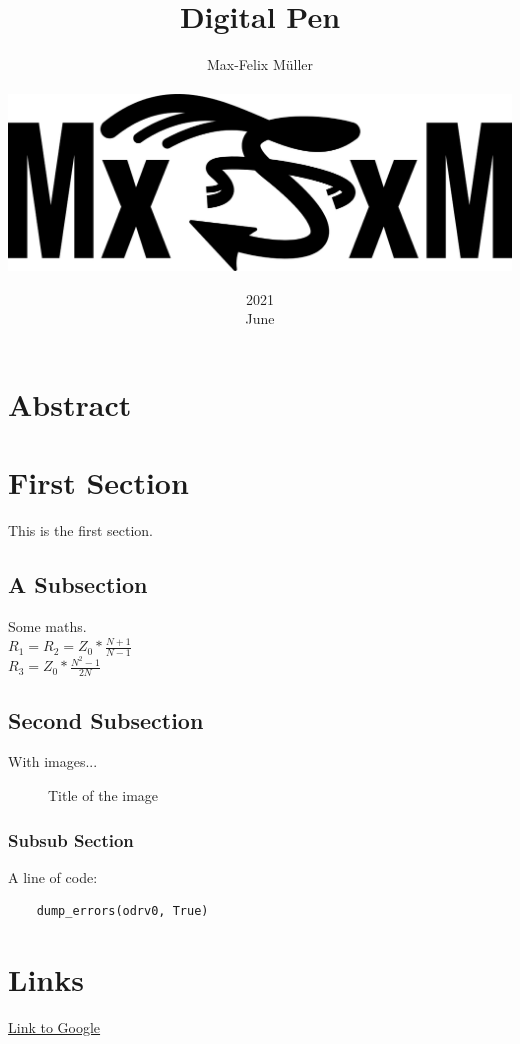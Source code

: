 \documentclass[a4paper,titlepage]{article}
\title{Digital Pen}
\date{2021\\ June}
\author{Max-Felix Müller\\ \\ \includegraphics[width=\textwidth]{mxfxm.png}}
\begin{document}
\maketitle
\tableofcontents
\newpage
\listoffigures %
\listoftables %
\newpage

\section*{Abstract}

\section{First Section}
This is the first section.

\subsection{A Subsection}
Some maths. \\

$R_{1} = R_{2} = Z_{0} * \frac{N + 1}{N - 1} $\\

$R_{3} = Z_{0} * \frac{N^2 - 1}{2N} $\\

\subsection{Second Subsection}

With images...

\begin{figure}[H]
    \caption{Title of the image}
\end{figure}

\subsubsection{Subsub Section}
A line of code:

\begin{lstlisting}
    dump_errors(odrv0, True)
\end{lstlisting}

\section{Links}
\href{https://google.com}{Link to Google}
\end{document}

